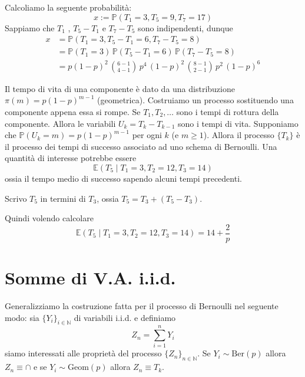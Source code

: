 \begin{example}{}
    Calcoliamo la seguente probabilità:
    \[
      x := \mathbb{P}{(T_{1} = 3, T_{5} = 9, T_{7} = 17)}
    \]
    Sappiamo che \(T_{1}\) , \(T_{5} - T_{1}\) e \(T_{7} - T_{5}\) sono
    indipendenti, dunque
    \begin{align*}
        x &= \mathbb{P}{(T_{1} = 3, T_{5} - T_{1} = 6, T_{7} - T_{5} = 8)} \\
         &= \mathbb{P}{(T_{1}=3)} \, \mathbb{P}{(T_{5}-T_{1}= 6)} \,
         \mathbb{P}{(T_{7} - T_{5} = 8)} \\
         &= p {(1-p)}^2 \, \binom{6-1}{4-1} \, p^{4} \, {(1-p)}^2 \,
         \binom{8-1}{2-1} \, p^2 \, {(1-p)}^{6}
    \end{align*}
\end{example}

\begin{example}
    Il tempo di vita di una componente è dato da una distribuzione \(\pi{(m)} =
    p {(1-p)}^{m-1}\) (geometrica). Costruiamo un processo sostituendo una
    componente appena essa si rompe. Se \(T_{1}, T_{2}, \dots\) sono i tempi di
    rottura della componente. Allora le variabili \(U_k = T_k - T_{k-1} \) sono
    i tempi di vita. Supponiamo che \(\mathbb{P}{(U_k = m)} = p {(1-p)}^{m-1}\)
    per ogni \(k\) (e \(m\ge 1\)). Allora il processo \(\{T_k\} \) è il processo
    dei tempi di successo associato ad uno schema di Bernoulli. Una quantità di
    interesse potrebbe essere 
    \[
      \mathbb{E}{(T_{5} \;|\; T_{1} = 3, T_{2} = 12, T_{3} = 14)}
    \]
    ossia il tempo medio di successo sapendo alcuni tempi precedenti.

    Scrivo \(T_{5}\) in termini di \(T_{3}\), ossia \(T_{5} = T_{3} + {(T_{5} -
    T_{3})}\).

    Quindi volendo calcolare
    \[
      \mathbb{E}{(T_{5} \;|\; T_{1} = 3, T_{2} = 12, T_{3} = 14)} = 14 +
      \frac{2}{p}
    \]
    
\end{example}

\section{Somme di V.A. i.i.d.}
Generalizziamo la costruzione fatta per il processo di Bernoulli nel seguente
modo: sia \(\{Y_{i}\} _{i \in \mathbb{N}} \) di variabili i.i.d. e definiamo
\[
  Z_{n} = \sum_{i=1}^{n} Y_{i} 
\]
siamo interessati alle proprietà del processo \(\{Z_{n}\} _{n \in \mathbb{N}}
\). Se \(Y_{i} \sim \mathrm{Ber}{(p)}\) allora \(Z_{n} \equiv \cap\) e se
\(Y_{i} \sim \mathrm{Geom}{(p)}\) allora \(Z_{n} \equiv T_k\).


